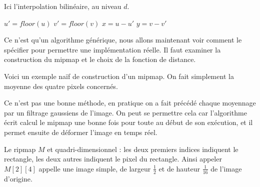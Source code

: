 \medbreak
\medbreak
Ici l'interpolation bilinéaire, au niveau $d$.
\medbreak
\medbreak

\begin{algorithm}[H]
\caption{$bilinearMipMap(u,v,M)$}
$u'=floor(u)$\;
$v' = floor(v)$\;
$x=u-u'$\;
$y = v-v'$\;
\;
\end{algorithm}

\medbreak
\medbreak
Ce n'est qu'un algorithme générique, nous allons maintenant voir comment le spécifier pour permettre une implémentation réelle. Il faut examiner la construction du mipmap et le choix de la fonction de distance.


Voici un exemple naïf de construction d'un mipmap. On fait simplement la moyenne des quatre pixels concernés.
 \medbreak
  \medbreak
 \begin{algorithm}[H]
 \caption{$buildMipMap(*img)$}
 \end{algorithm}
 \medbreak
  \medbreak
 Ce n'est pas une bonne méthode, en pratique on a fait précédé chaque moyennage par un filtrage gaussiens de l'image. On peut se permettre cela car l'algorithme écrit calcul le mipmap une bonne fois pour toute au début de son exécution, et il permet ensuite de déformer l'image en temps réel.  




Le ripmap $M$ et quadri-dimensionnel  : les deux premiers indices indiquent le rectangle, les deux autres indiquent le pixel du rectangle. Ainsi appeler $M[2][4]$ appelle une image simple, de largeur $\frac{1}{2}$ et de hauteur $\frac{1}{16}$ de l'image d'origine.


